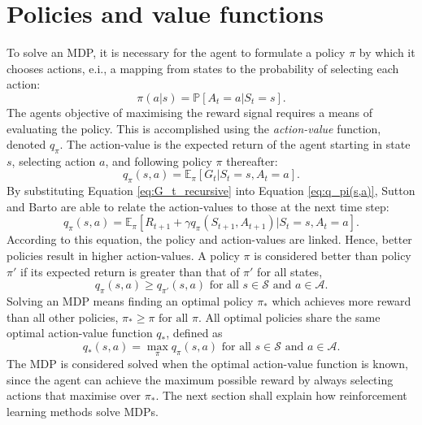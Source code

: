 \section{Policies and value functions}
To solve an MDP, it is necessary for the agent to formulate a policy $\pi$ by which it chooses actions, e.i., a mapping from states to the probability of selecting each action:
\begin{equation}
\pi(a|s) = \mathbb{P} [A_t=a | S_t=s].
\label{eq:pi(a|s)}
\end{equation}
The agents objective of maximising the reward signal requires a means of evaluating the policy.
This is accomplished using the \emph{action-value} function, denoted $q_\pi$.
The action-value is the expected return of the agent starting in state $s$, selecting action $a$, and following policy $\pi$ thereafter:
\begin{equation}
q_\pi(s,a) = \mathbb{E}_{\pi} [G_t | S_t=s, A_t=a].
\label{eq:q_pi(s,a)}
\end{equation}
By substituting Equation \ref{eq:G_t_recursive} into Equation \ref{eq:q_pi(s,a)}, Sutton and Barto are able to relate the action-values to those at the next time step:
\begin{equation}
q_\pi(s,a) = \mathbb{E}_{\pi} [R_{t+1} + \gamma q_{\pi}(S_{t+1}, A_{t+1}) | S_t = s, A_t=a].
\label{eq:q_pi(s,a)_1}
\end{equation}
According to this equation, the policy and action-values are linked. 
Hence, better policies result in higher action-values.
A policy $\pi$ is considered better than policy $\pi'$ if its expected return is greater than that of $\pi'$ for all states, 
\begin{equation}\label{eq:better_policy_cond}
    q_\pi(s,a) \geq q_{\pi'}(s,a) \text{ for all } s \in \mathcal{S} \text{ and } a \in \mathcal{A}.
\end{equation}
Solving an MDP means finding an optimal policy $\pi_*$ which achieves more reward than all other policies,
$\pi_* \geq \pi \text{ for all } \pi$. All optimal policies share the same optimal action-value function $q_*$, defined as 
\begin{equation}
    q_*(s,a)=\max_\pi q_\pi(s,a) \text{ for all } s \in \mathcal{S} \text{ and } a \in \mathcal{A}.
\label{eq:q_*(s,a)}
\end{equation}
The MDP is considered solved when the optimal action-value function is known, since the agent can achieve the maximum possible reward by always selecting actions that maximise over $\pi_*$.
The next section shall explain how reinforcement learning methods solve MDPs.





